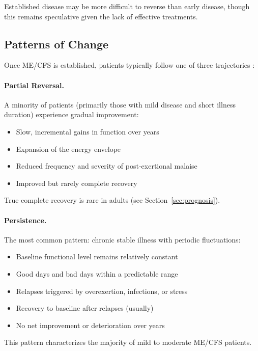 Established disease may be more difficult to reverse than early disease, though this remains speculative given the lack of effective treatments.

\subsection{Patterns of Change}

Once ME/CFS is established, patients typically follow one of three trajectories \cite{Maksoud2020natural}:

\paragraph{Partial Reversal.}
A minority of patients (primarily those with mild disease and short illness duration) experience gradual improvement:
\begin{itemize}
    \item Slow, incremental gains in function over years
    \item Expansion of the energy envelope
    \item Reduced frequency and severity of post-exertional malaise
    \item Improved but rarely complete recovery
\end{itemize}

True complete recovery is rare in adults (see Section~\ref{sec:prognosis}).

\paragraph{Persistence.}
The most common pattern: chronic stable illness with periodic fluctuations:
\begin{itemize}
    \item Baseline functional level remains relatively constant
    \item Good days and bad days within a predictable range
    \item Relapses triggered by overexertion, infections, or stress
    \item Recovery to baseline after relapses (usually)
    \item No net improvement or deterioration over years
\end{itemize}

This pattern characterizes the majority of mild to moderate ME/CFS patients.

